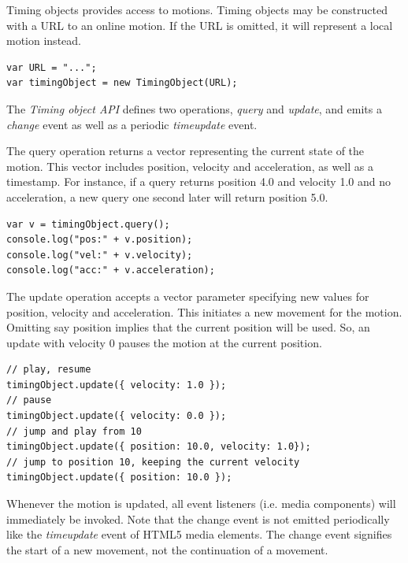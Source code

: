 Timing objects provides access to motions. Timing objects may be constructed
with a URL to an online motion. If the URL is omitted, it will represent a
local motion instead.

\begin{lstlisting}[caption=Constructing a timing object.]
var URL = "...";
var timingObject = new TimingObject(URL);
\end{lstlisting}

The \emph{Timing object API} defines two operations, \emph{query} and
\emph{update}, and emits a \emph{change} event as well as a periodic
\emph{timeupdate} event.



The query operation returns a vector representing the current state of the
motion. This vector includes position, velocity and acceleration, as well as a
timestamp. For instance, if a query returns position 4.0 and velocity 1.0 and no acceleration, a
new query one second later will return position 5.0.

\begin{lstlisting}[caption=Querying the timing object to get a snapshot vector.]
var v = timingObject.query();
console.log("pos:" + v.position);
console.log("vel:" + v.velocity);
console.log("acc:" + v.acceleration);
\end{lstlisting}



The update operation accepts a vector parameter specifying new values for
position, velocity and acceleration. This initiates a new movement for the
motion. Omitting say position implies that the current position will be used.
So, an update with velocity 0 pauses the motion at the current position.

\begin{lstlisting}[caption=Updating the motion.]
// play, resume
timingObject.update({ velocity: 1.0 }); 
// pause
timingObject.update({ velocity: 0.0 });
// jump and play from 10
timingObject.update({ position: 10.0, velocity: 1.0});
// jump to position 10, keeping the current velocity
timingObject.update({ position: 10.0 });
\end{lstlisting}



Whenever the motion is updated, all event listeners (i.e. media components)
will immediately be invoked. Note that the change event is not emitted
periodically like the \emph{timeupdate} event of HTML5 media elements. The change event signifies the start of a
new movement, not the continuation of a movement.

